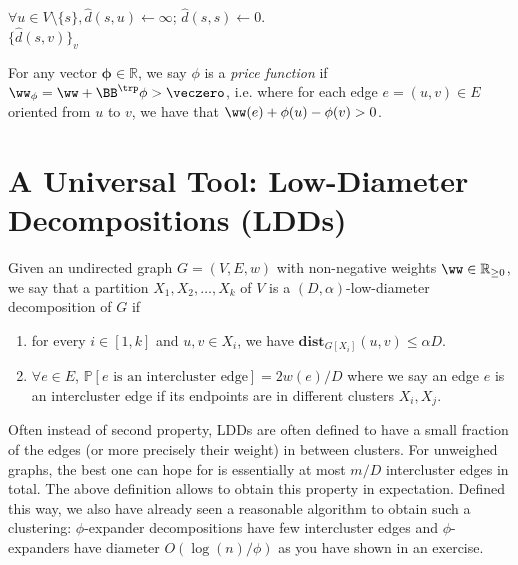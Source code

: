 \begin{algorithm}
$\forall u \in V \setminus \{s\}, \hat{d}(s, u) \gets \infty$; $\hat{d}(s,s) \gets 0$.\\
\Return $\{\hat{d}(s, v) \}_v$
\caption{$\textsc{BellmanFord}(G,s, \eta)$}
\end{algorithm}






\begin{definition}
For any vector $\mathbf{\phi} \in \mathbb{R}$, we say $\phi$ is a \emph{price function} if $\ww_{\mathbf{\phi}} = \ww + \BB^{\trp} \mathbf{\phi} > \veczero$, i.e. where for each edge $e = (u,v) \in E$ oriented from $u$ to $v$, we have that $\ww(e) + \phi(u) - \phi(v) > 0$.
\end{definition}



\section{A Universal Tool: Low-Diameter Decompositions (LDDs)}

\begin{definition}
Given an undirected graph $G = (V,E,w)$ with non-negative weights $\ww \in \mathbb{R}_{\geq 0}$, we say that a partition $X_1, X_2, \ldots, X_k$ of $V$ is a $(D, \alpha)$-low-diameter decomposition of $G$ if
\begin{enumerate}
\item  for every $i \in [1, k]$ and $u,v \in X_i$, we have $\mathbf{dist}_{G[X_i]}(u,v) \leq \alpha D$. 
\item $\forall e \in E$, $\mathbb{P}[e \text{ is an intercluster edge}] = 2w(e)/ D$ where we say an edge $e$ is an intercluster edge if its endpoints are in different clusters $X_i, X_j$. 
\end{enumerate}
\end{definition}
\begin{remark}
Often instead of second property, LDDs are often defined to have a small fraction of the edges (or more precisely their weight) in between clusters. For unweighed graphs, the best one can hope for is essentially at most $m/D$ intercluster edges in total.  The above definition allows to obtain this property in expectation. Defined this way, we also have already seen a reasonable algorithm to obtain such a clustering: $\phi$-expander decompositions have few intercluster edges and $\phi$-expanders have diameter $O(\log(n)/\phi)$ as you have shown in an exercise.
\end{remark}

